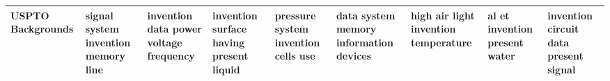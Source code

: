 \documentclass[11pt,a4paper]{article}
\begin{document}
\begin{appendices}
\begin{table}[htp]
\begin{tiny}
\begin{tabular}{|p{}|p{}|p{}|p{}|p{}|p{}|p{}|p{}|p{}|}
USPTO Backgrounds & signal \newline system \newline invention \newline memory \newline line & invention \newline data \newline power \newline voltage \newline frequency & invention \newline surface \newline having \newline present \newline liquid & pressure \newline system \newline invention \newline cells \newline use & data \newline system \newline memory \newline information \newline devices & high \newline air \newline light \newline invention \newline temperature & al \newline et \newline invention \newline present \newline water & invention \newline circuit \newline data \newline present \newline signal\\\hline

\end{tabular}
\end{tiny}
\end{table}
\end{appendices}
\end{document}
